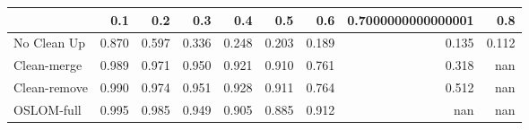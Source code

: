 \begin{tabular}{lrrrrrrrr}
\toprule
{} &   0.1 &   0.2 &   0.3 &   0.4 &   0.5 &   0.6 & 0.7000000000000001 &   0.8 \\
\midrule
No Clean Up  & 0.870 & 0.597 & 0.336 & 0.248 & 0.203 & 0.189 &              0.135 & 0.112 \\
Clean-merge  & 0.989 & 0.971 & 0.950 & 0.921 & 0.910 & 0.761 &              0.318 &   nan \\
Clean-remove & 0.990 & 0.974 & 0.951 & 0.928 & 0.911 & 0.764 &              0.512 &   nan \\
OSLOM-full   & 0.995 & 0.985 & 0.949 & 0.905 & 0.885 & 0.912 &                nan &   nan \\
\bottomrule
\end{tabular}
